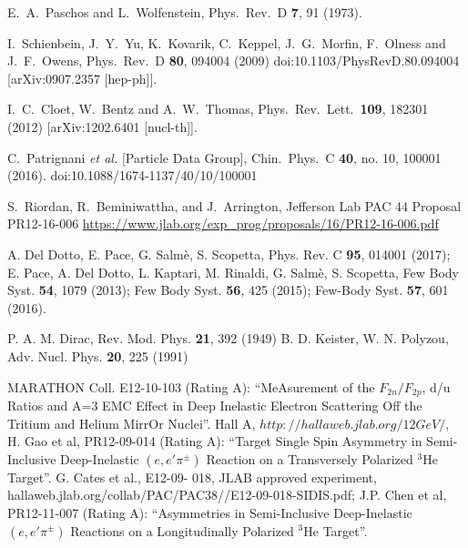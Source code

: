 \documentclass[twocolumn]{revtex4}
\begin{document}
\begin{thebibliography}{25}
        E.~A.~Paschos and L.~Wolfenstein,
        Phys.\ Rev.\ D {\bf 7}, 91 (1973).

          I.~Schienbein, J.~Y.~Yu, K.~Kovarik, C.~Keppel, J.~G.~Morfin, F.~Olness and J.~F.~Owens,
            Phys.\ Rev.\ D {\bf 80}, 094004 (2009)
              doi:10.1103/PhysRevD.80.094004
                [arXiv:0907.2357 [hep-ph]].

        I.~C.~Cloet, W.~Bentz and A.~W.~Thomas,
        Phys.\ Rev.\ Lett.\  {\bf 109}, 182301 (2012)
        [arXiv:1202.6401 [nucl-th]].

        C.~Patrignani {\it et al.} [Particle Data Group],
        Chin.\ Phys.\ C {\bf 40}, no. 10, 100001 (2016).
        doi:10.1088/1674-1137/40/10/100001

        S.~Riordan, R.~Beminiwattha, and J.~Arrington,
        Jefferson Lab PAC 44 Proposal PR12-16-006
       \url{https://www.jlab.org/exp_prog/proposals/16/PR12-16-006.pdf}



A. Del Dotto, E. Pace, G. Salm\`e, S. Scopetta, Phys. Rev. C {\bf 95}, 014001 (2017);
E. Pace, A. Del Dotto, L. Kaptari, M. Rinaldi, G. Salm\`e, S. Scopetta,
Few Body Syst. {\bf 54}, 1079 (2013);
Few Body Syst. {\bf 56}, 425 (2015);
Few-Body Syst. {\bf 57},  601 (2016). 



 P. A. M. Dirac, Rev. Mod. Phys. {\bf 21}, 392 (1949)
  B. D. Keister, W. N. Polyzou, Adv.  Nucl. Phys. {\bf 20}, 225
(1991)

MARATHON Coll. E12-10-103    (Rating A):
``MeAsurement of the $F_{2n}/F_{2p}$, d/u Ratios and A=3 EMC Effect in Deep
Inelastic Electron Scattering Off the Tritium and Helium MirrOr Nuclei''.
Hall  A, $http://hallaweb.jlab.org/12GeV/$,
H. Gao et al,   PR12-09-014 (Rating A): 
``Target Single Spin
Asymmetry in Semi-Inclusive Deep-Inelastic  $(e, e' \pi^\pm)$
Reaction on a Transversely Polarized $^{3}${{He}} Target''.
 G. Cates et al., E12-09- 018, JLAB approved experiment, hallaweb.jlab.org/collab/PAC/PAC38//E12-09-018-SIDIS.pdf; 
J.P. Chen et al,         PR12-11-007 (Rating A):
``Asymmetries in Semi-Inclusive Deep-Inelastic  $(e, e' \pi^\pm)$ Reactions
on a Longitudinally Polarized  $^{3}${{He}} Target''.


\end{thebibliography}
\end{document}
